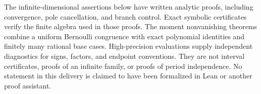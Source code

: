 The infinite-dimensional assertions below have written analytic proofs,
including convergence, pole cancellation, and branch control. Exact
symbolic certificates verify the finite algebra used in those proofs.
The moment nonvanishing theorems combine a uniform Bernoulli congruence
with exact polynomial identities and finitely many rational base cases.
High-precision evaluations supply independent diagnostics for signs,
factors, and endpoint conventions. They are not interval certificates,
proofs of an infinite family, or proofs of period independence.
No statement in this delivery is claimed to have been formalized in
Lean or another proof assistant.

